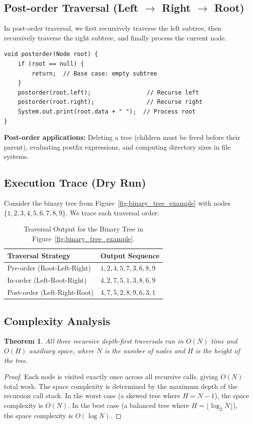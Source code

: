 \documentclass[10pt,journal,compsoc,onecolumn]{IEEEtran}
\newtheorem{theorem}{Theorem}
\begin{document}
\subsection{Post-order Traversal (Left $\to$ Right $\to$ Root)}

In post-order traversal, we first recursively traverse the left subtree, then recursively traverse the right subtree, and finally process the current node.

\begin{verbatim}
void postorder(Node root) {
    if (root == null) {
        return;  // Base case: empty subtree
    }
    postorder(root.left);                // Recurse left
    postorder(root.right);               // Recurse right
    System.out.print(root.data + " ");  // Process root
}
\end{verbatim}

\textbf{Post-order applications:} Deleting a tree (children must be freed before their parent), evaluating postfix expressions, and computing directory sizes in file systems.

\subsection{Execution Trace (Dry Run)}

Consider the binary tree from Figure~\ref{fig:binary_tree_example} with nodes $\{1, 2, 3, 4, 5, 6, 7, 8, 9\}$. We trace each traversal order:

\begin{table}[htbp]
\centering
\caption{Traversal Output for the Binary Tree in Figure~\ref{fig:binary_tree_example}.}
\label{tab:traversal_output}
\begin{tabular}{ll}
\toprule
Traversal Strategy & Output Sequence \\
\midrule
Pre-order (Root-Left-Right) & $1, 2, 4, 5, 7, 3, 6, 8, 9$ \\
In-order (Left-Root-Right) & $4, 2, 7, 5, 1, 3, 8, 6, 9$ \\
Post-order (Left-Right-Root) & $4, 7, 5, 2, 8, 9, 6, 3, 1$ \\
\bottomrule
\end{tabular}
\end{table}

\subsection{Complexity Analysis}
\begin{theorem}
All three recursive depth-first traversals run in $O(N)$ time and $O(H)$ auxiliary space, where $N$ is the number of nodes and $H$ is the height of the tree.
\end{theorem}
\begin{proof}
Each node is visited exactly once across all recursive calls, giving $O(N)$ total work. The space complexity is determined by the maximum depth of the recursion call stack. In the worst case (a skewed tree where $H = N - 1$), the space complexity is $O(N)$. In the best case (a balanced tree where $H = \lfloor \log_2 N \rfloor$), the space complexity is $O(\log N)$.
\end{proof}
\end{document}

